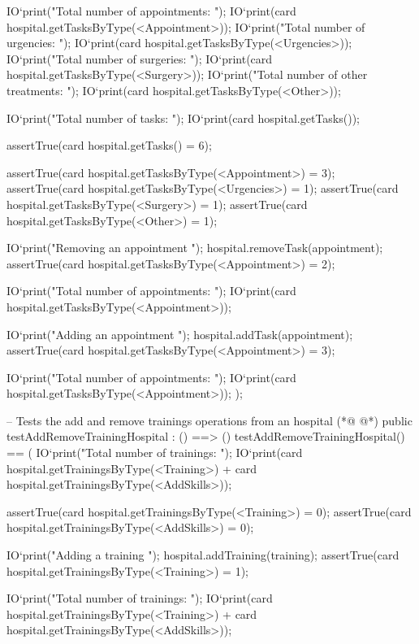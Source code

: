 \begin{vdmpp}[breaklines=true]
      IO`print("\n\n Total number of appointments: ");
      IO`print(card hospital.getTasksByType(<Appointment>));
      IO`print("\n Total number of urgencies: ");
      IO`print(card hospital.getTasksByType(<Urgencies>));
      IO`print("\n Total number of surgeries: ");
      IO`print(card hospital.getTasksByType(<Surgery>));
      IO`print("\n Total number of other treatments: ");
      IO`print(card hospital.getTasksByType(<Other>));
      
      IO`print("\n\n Total number of tasks: ");
      IO`print(card hospital.getTasks());
      
      assertTrue(card hospital.getTasks() = 6);
      
      assertTrue(card hospital.getTasksByType(<Appointment>) = 3);
      assertTrue(card hospital.getTasksByType(<Urgencies>) = 1);
      assertTrue(card hospital.getTasksByType(<Surgery>) = 1);
      assertTrue(card hospital.getTasksByType(<Other>) = 1);
      
      IO`print("\n\n Removing an appointment \n");
      hospital.removeTask(appointment);
      assertTrue(card hospital.getTasksByType(<Appointment>) = 2);
      
      IO`print("\n Total number of appointments: ");
      IO`print(card hospital.getTasksByType(<Appointment>));
      
      IO`print("\n Adding an appointment \n");
      hospital.addTask(appointment);
      assertTrue(card hospital.getTasksByType(<Appointment>) = 3); 
      
      IO`print("\n Total number of appointments: ");
      IO`print(card hospital.getTasksByType(<Appointment>));  
  );
  
  -- Tests the add and remove trainings operations from an hospital
(*@
\label{testAddRemoveTrainingHospital:232}
@*)
  public testAddRemoveTrainingHospital : () ==> ()
   testAddRemoveTrainingHospital() == (
    IO`print("\n\n Total number of trainings: ");
    IO`print(card hospital.getTrainingsByType(<Training>) + card hospital.getTrainingsByType(<AddSkills>));

    assertTrue(card hospital.getTrainingsByType(<Training>) = 0);
    assertTrue(card hospital.getTrainingsByType(<AddSkills>) = 0);
    
    IO`print("\n Adding a training \n");
    hospital.addTraining(training);
    assertTrue(card hospital.getTrainingsByType(<Training>) = 1);
    
    IO`print("\n Total number of trainings: ");
    IO`print(card hospital.getTrainingsByType(<Training>) + card hospital.getTrainingsByType(<AddSkills>));
    

\end{vdmpp}
